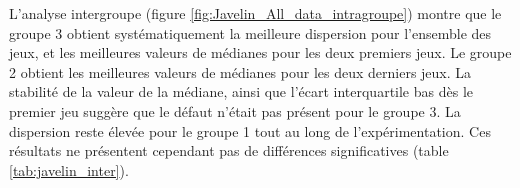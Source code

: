 L'analyse intergroupe (figure \ref{fig:Javelin_All_data_intragroupe}) montre que le groupe 3 obtient systématiquement la meilleure dispersion pour l'ensemble des jeux, et les meilleures valeurs de médianes pour les deux premiers jeux. Le groupe 2 obtient les meilleures valeurs de médianes pour les deux derniers jeux. La stabilité de la valeur de la médiane, ainsi que l'écart interquartile bas dès le premier jeu suggère que le défaut n'était pas présent pour le groupe 3. La dispersion reste élevée pour le groupe 1 tout au long de l'expérimentation. Ces résultats ne présentent cependant pas de différences significatives (table \ref{tab:javelin_inter}).

